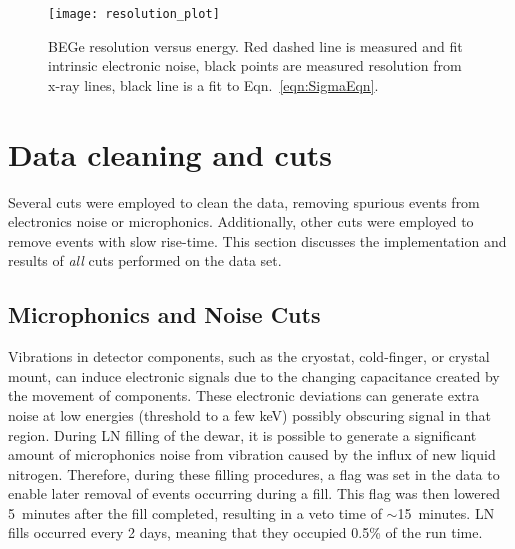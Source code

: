 			\begin{figure}
				\centering
				\texttt{[image: resolution\_plot]}
				\caption[BeGe resolution versus energy]
				{BEGe resolution versus energy.  Red dashed line is measured and fit intrinsic electronic noise, 
				black points are measured resolution from x-ray lines, black line is a fit to Eqn.~\ref{eqn:SigmaEqn}.}
				\label{fig:BeGeResPlot}
			\end{figure}





	\section{Data cleaning and cuts}
	\label{sec:BeGeCuts}	
	
	Several cuts were employed to clean the data, removing spurious events from electronics noise or microphonics.  Additionally, other cuts were employed to remove events with slow rise-time.  This section discusses the implementation and results of \emph{all} cuts performed on the data set.  
	
		\subsection{Microphonics and Noise Cuts}
	     	\label{sec:MicroCuts}	
	
	Vibrations in detector components, such as the cryostat, cold-finger, or crystal mount, can induce electronic signals due to the changing capacitance created by the movement of components.  These electronic deviations can generate extra noise at low energies (threshold to a few keV) possibly obscuring signal in that region.  During LN filling of the dewar, it is possible to generate a significant amount of microphonics noise from vibration caused by the influx of new liquid nitrogen.  Therefore, during these filling procedures, a flag was set in the data to enable later removal of events occurring during a fill.  This flag was then lowered 5~minutes after the fill completed, resulting in a veto time of $\sim$15~minutes.  LN fills occurred every 2 days, meaning that they occupied 0.5\% of the run time.  
		
